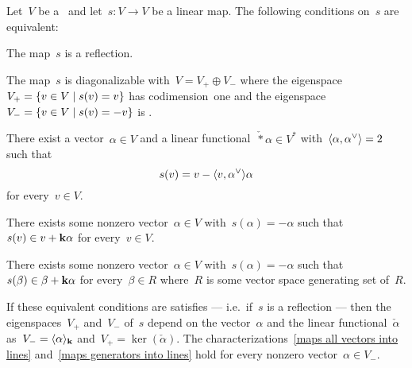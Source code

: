 \begin{lemma}
  \label{characterizations of reflections}
  Let~$V$ be a~{\vectorspace{$\kf$}} and let~$s \colon V \to V$ be a linear map.
  The following conditions on~$s$ are equivalent:
  \begin{equivalenceslist}
    \item
      \label{is a reflection}
      The map~$s$ is a reflection.
    \item
      \label{is suitable diagonalizable}
      The map~$s$ is diagonalizable with~$V = V_+ \oplus V_-$ where the eigenspace~$V_+ = \{v \in V \suchthat s(v) = v\}$ has codimension~one and the eigenspace~$V_- = \{v \in V \suchthat s(v) = -v\}$ is {\onedimensional}.
    \item
      \label{existence of dual check}
      There exist a vector~$\alpha \in V$ and a linear functional~$\check*{\alpha} \in V^*$ with~$\pair{\alpha, \check{\alpha}} = 2$ such that
      \[
        s(v)
        =
        v - \pair{v, \check{\alpha}} \alpha
      \]
      for every~$v \in V$.
    \item
      \label{maps all vectors into lines}
      There exists some nonzero vector~$\alpha \in V$ with~$s(\alpha) = -\alpha$ such that~$s(v) \in v + \mathbf{k} \alpha$ for every~$v \in V$.
    \item
      \label{maps generators into lines}
      There exists some nonzero vector~$\alpha \in V$ with~$s(\alpha) = -\alpha$ such that~$s(\beta) \in \beta + \mathbf{k} \alpha$ for every~$\beta \in R$ where~$R$ is some vector space generating set of~$R$.
  \end{equivalenceslist}
  If these equivalent conditions are satisfies --- i.e.\ if~$s$ is a reflection --- then the eigenspaces~$V_+$ and~$V_-$ of~$s$ depend on the vector~$\alpha$ and the linear functional~$\check{\alpha}$ as~$V_- = \langle\alpha\rangle_{\mathbf{k}}$ and~$V_+ = \ker(\check{\alpha})$.
  The characterizations~\ref*{maps all vectors into lines} and~\ref*{maps generators into lines} hold for every nonzero vector~$\alpha \in V_-$.
\end{lemma}


